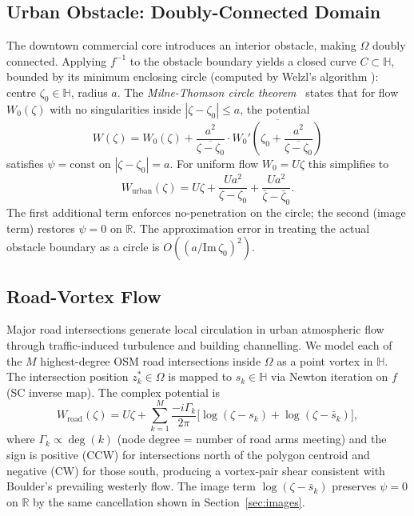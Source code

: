\documentclass[11pt]{article}
\newcommand{\HH}{\mathbb{H}}          %
\newcommand{\RR}{\mathbb{R}}
\newcommand{\conj}[1]{\overline{#1}}
\newcommand{\Imag}{\mathrm{Im}}
\begin{document}
\subsection{Urban Obstacle: Doubly-Connected Domain}
\label{sec:urban}

The downtown commercial core introduces an interior obstacle, making $\Omega$
doubly connected. Applying $f^{-1}$ to the obstacle boundary yields a closed
curve $C\subset\HH$, bounded by its minimum enclosing circle (computed by
Welzl's algorithm \citep{Welzl91}): centre $\zeta_0\in\HH$, radius $a$. The
\emph{Milne-Thomson circle theorem}~\citep[Ch.~6]{MT68} states that for
flow $W_0(\zeta)$ with no singularities inside $|\zeta-\zeta_0|\leq a$,
the potential
\begin{equation}
  W(\zeta) = W_0(\zeta)
    + \frac{a^2}{\conj{\zeta-\zeta_0}}\cdot \conj{W_0'\!\left(\zeta_0
      + \frac{a^2}{\conj{\zeta-\zeta_0}}\right)}
  \label{eq:circle-general}
\end{equation}
satisfies $\psi=\mathrm{const}$ on $|\zeta-\zeta_0|=a$. For uniform flow
$W_0=U\zeta$ this simplifies to
\begin{equation}
  W_{\mathrm{urban}}(\zeta) = U\zeta
    + \frac{Ua^2}{\zeta-\zeta_0}
    + \frac{Ua^2}{\bar{\zeta}-\bar{\zeta}_0}.
  \label{eq:urban}
\end{equation}
The first additional term enforces no-penetration on the circle; the second
(image term) restores $\psi=0$ on $\RR$. The approximation error in treating
the actual obstacle boundary as a circle is $O((a/\Imag\,\zeta_0)^2)$.

\subsection{Road-Vortex Flow}
\label{sec:road}

Major road intersections generate local circulation in urban atmospheric flow
through traffic-induced turbulence and building channelling. We model each of
the $M$ highest-degree OSM road intersections inside $\Omega$ as a point vortex
in $\HH$. The intersection position $z^*_k\in\Omega$ is mapped to $s_k\in\HH$
via Newton iteration on $f$ (SC inverse map). The complex potential is
\begin{equation}
  W_{\mathrm{road}}(\zeta) = U\zeta
  + \sum_{k=1}^{M}\frac{-i\Gamma_k}{2\pi}
    \bigl[\log(\zeta-s_k)+\log(\zeta-\bar{s}_k)\bigr],
  \label{eq:road}
\end{equation}
where $\Gamma_k\propto\deg(k)$ (node degree = number of road arms meeting)
and the sign is positive (CCW) for intersections north of the polygon centroid
and negative (CW) for those south, producing a vortex-pair shear consistent
with Boulder's prevailing westerly flow. The image term $\log(\zeta-\bar{s}_k)$
preserves $\psi=0$ on $\RR$ by the same cancellation shown in Section~\ref{sec:images}.
\end{document}
